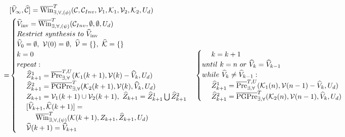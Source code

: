 {\small
\begin{align}
&[\widehat{V}_\infty, \widehat{\mathcal{C}}]=\overline{\text{Win}}_{\exists, \forall,(\phi)}^{T}(\mathcal{C},\mathcal{C}_{Inv},\mathcal{V}_1,\mathcal{K}_1,\mathcal{V}_2,\mathcal{K}_2,U_d)\nonumber\\
=&\begin{cases}\widehat{V}_{\text{inv}} = \overline{\text{Win}}^{T}_{\exists, \forall,(\psi)} (\mathcal{C}_{Inv},\emptyset,\emptyset,U_d)\\
Restrict~ synthesis~ to~ \widehat{V}_{\text{inv}}\\
\widehat{V}_0 = \emptyset,\ \mathcal{V}(0)=\emptyset,\ \widehat{\mathcal{V}}=\{\},\ \widehat{\mathcal{K}}=\{\}\\
{\color{black} k=0}\\
{\color{black} repeat:}\\
\ \ \ \ \widehat{Z}_{k+1}^1 =  \overline{\text{Pre}}_{\exists,\forall}^{T,U}(\mathcal{K}_1(k+1),\mathcal{V}(k)-\widehat{V}_k,U_d)\\
\ \ \ \ \widehat{Z}_{k+1}^2 = \overline{\text{PGPre}}_{\exists,\forall}^{T} ( \mathcal{K}_2(k+1),\mathcal{V}(k), \widehat{V}_k,U_d)\\
\ \ \ \ Z_{k+1}=\mathcal{V}_1(k+1)\cup\mathcal{V}_2(k+1),\  \widehat{Z}_{k+1} = \widehat{Z}_{k+1}^1\bigcup\widehat{Z}_{k+1}^2  \\
\ \ \ \ [\widehat{V}_{k+1},\widehat{\mathcal{K}}(k+1)]=\\
\ \ \ \ \ \ \ \ \overline{\text{Win}}_{\exists,\forall,(\psi)}^{T}(\mathcal{K}(k+1),Z_{k+1},\widehat{Z}_{k+1},U_d)\\
\ \ \ \ \widehat{\mathcal{V}}(k+1)=\widehat{V}_{k+1}\\
\end{cases}
\begin{cases}
\ \ \ \ {\color{black} k = k+1}\\
{\color{black} until \ k=n \ or \ \widehat{V}_{k}=\widehat{V}_{k-1} }\\
{\color{black} while \ \widehat{V}_{k}\not=\widehat{V}_{k-1}:}\\
\ \ \ \ \widehat{Z}_{k+1}^1 =  \overline{\text{Pre}}_{\exists,\forall}^{T,U}(\mathcal{K}_1(n),\mathcal{V}(n-1)-\widehat{V}_k,U_d)\\
\ \ \ \ \widehat{Z}_{k+1}^2 = \overline{\text{PGPre}}_{\exists,\forall}^{T} ( \mathcal{K}_2(n),\mathcal{V}(n-1), \widehat{V}_k,U_d)\\

\end{cases}
\end{align}}
